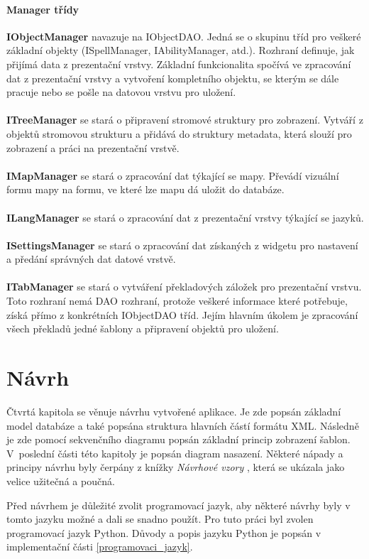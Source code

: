 \documentclass[thesis=B,czech]{resources/FITthesis}[2012/06/26]
\begin{document}
\subsubsection*{Manager třídy}
\textbf{IObjectManager} navazuje na IObjectDAO. Jedná se o skupinu tříd pro veškeré základní objekty (ISpellManager, IAbilityManager, atd.). Rozhraní definuje, jak přijímá data z prezentační vrstvy. Základní funkcionalita spočívá ve zpracování dat z prezentační vrstvy a vytvoření kompletního objektu, se kterým se dále pracuje nebo se pošle na datovou vrstvu pro uložení.\\
\\
\noindent\textbf{ITreeManager} se stará o připravení stromové struktury pro zobrazení. Vytváří z objektů stromovou strukturu a přidává do struktury metadata, která slouží pro zobrazení a práci na prezentační vrstvě.\\
\\
\textbf{IMapManager} se stará o zpracování dat týkající se mapy. Převádí vizuální formu mapy na formu, ve které lze mapu dá uložit do databáze. \\
\\
\textbf{ILangManager} se stará o zpracování dat z prezentační vrstvy týkající se jazyků.\\
\\
\textbf{ISettingsManager} se stará o zpracování dat získaných z widgetu pro nastavení a předání správných dat datové vrstvě.\\
\\
\textbf{ITabManager} se stará o vytváření překladových záložek pro prezentační vrstvu. Toto rozhraní nemá DAO rozhraní, protože veškeré informace které potřebuje, získá přímo z konkrétních IObjectDAO tříd. Jejím hlavním úkolem je zpracování všech překladů jedné šablony a připravení objektů pro uložení.\\





\chapter{Návrh}
Čtvrtá kapitola se věnuje návrhu vytvořené aplikace. Je zde popsán základní model databáze a také popsána struktura hlavních částí formátu XML. Následně je zde pomocí sekvenčního diagramu popsán základní princip zobrazení šablon. V~poslední části této kapitoly je popsán diagram nasazení. Některé nápady a principy návrhu byly čerpány z knížky \textit{Návrhové vzory} \cite{navrhove_vzory}, která se ukázala jako velice užitečná a poučná. \par
Před návrhem je důležité zvolit programovací jazyk, aby některé návrhy byly v tomto jazyku možné a dali se snadno použít. Pro tuto práci byl zvolen programovací jazyk Python. Důvody a popis jazyku Python je popsán v implementační části \ref{programovaci_jazyk}. 
\end{document}
